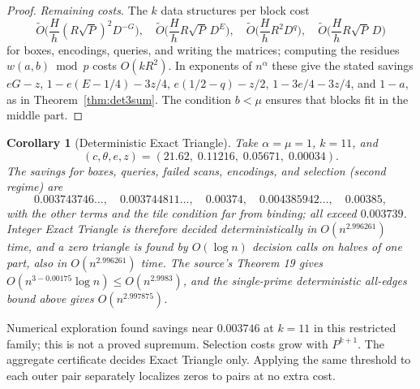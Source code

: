 \documentclass[11pt]{article}
\newtheorem{corollary}[theorem]{Corollary}
\newcommand{\softO}{\widetilde O}
\begin{document}
\begin{proof}
\emph{Remaining costs.} The $k$ data structures per block cost
\[
\softO\Big(\frac Hh(R\sqrt P)^2D^{-G}\Big),\quad
\softO\Big(\frac HhR\sqrt P\,D^E\Big),\quad
\softO\Big(\frac HhR^2D^q\Big),\quad
\softO\Big(\frac HhR\sqrt P\,D\Big)
\]
for boxes, encodings, queries, and writing the matrices; computing the
residues $w(a,b)\bmod p$ costs $O(kR^2)$. In exponents of $n^\alpha$ these give the stated savings
$eG-z$, $1-e(E-1/4)-3z/4$, $e(1/2-q)-z/2$, $1-3e/4-3z/4$, and $1-a$, as
in Theorem~\ref{thm:det3sum}. The condition $b<\mu$ ensures that blocks fit
in the middle part.
\end{proof}

\begin{corollary}[Deterministic Exact Triangle]
Take $\alpha=\mu=1$, $k=11$, and
\[
(c,\theta,e,z)=(21.62,\;0.11216,\;0.05671,\;0.00034).
\]
The savings for boxes, queries, failed scans, encodings, and selection
(second regime) are
\[
0.003743746\ldots,\quad 0.003744811\ldots,\quad 0.00374,\quad
0.004385942\ldots,\quad 0.00385,
\]
with the other terms and the tile condition far from binding; all exceed
$0.003739$. Integer Exact Triangle is
therefore decided deterministically in $O(n^{2.996261})$ time, and a zero
triangle is found by $O(\log n)$ decision calls on halves of one part, also
in $O(n^{2.996261})$ time. The source's Theorem 19 gives
$O(n^{3-0.00175}\log n)\le O(n^{2.9983})$, and the single-prime deterministic
all-edges bound above gives $O(n^{2.997875})$.
\end{corollary}
Numerical exploration found savings near $0.003746$ at $k=11$ in this
restricted family; this is not a proved supremum. Selection costs grow
with $P^{k+1}$. The aggregate
certificate decides Exact Triangle only. Applying the same threshold to each
outer pair separately localizes zeros to pairs at no extra cost.
\end{document}
